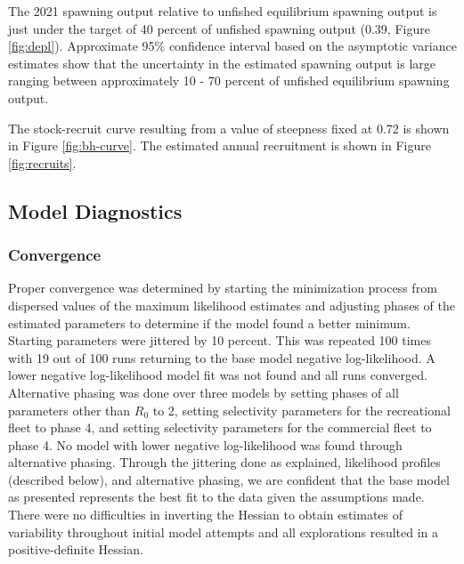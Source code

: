 \documentclass[11pt,
  english,
  a4paper,
]{article}
\begin{document}

The 2021 spawning output relative to unfished equilibrium spawning output is just under the target of 40 percent of unfished spawning output (0.39, Figure \ref{fig:depl}). Approximate 95\% confidence interval based on the asymptotic variance estimates show that the uncertainty in the estimated spawning output is large ranging between approximately 10 - 70 percent of unfished equilibrium spawning output.

\leavevmode\tagmcend\tagstructend\par


The stock-recruit curve resulting from a value of steepness fixed at 0.72 is shown in Figure \ref{fig:bh-curve}. The estimated annual recruitment is shown in Figure \ref{fig:recruits}.

\leavevmode\tagmcend\tagstructend\par


\hypertarget{model-diagnostics}{%
\subsection{Model Diagnostics}\label{model-diagnostics}}

\leavevmode\tagmcend\tagstructend


\hypertarget{convergence}{%
\subsubsection{Convergence}\label{convergence}}

\leavevmode\tagmcend\tagstructend


Proper convergence was determined by starting the minimization process from dispersed values of the maximum likelihood estimates and adjusting phases of the estimated parameters to determine if the model found a better minimum. Starting parameters were jittered by 10 percent. This was repeated 100 times with 19 out of 100 runs returning to the base model negative log-likelihood. A lower negative log-likelihood model fit was not found and all runs converged. Alternative phasing was done over three models by setting phases of all parameters other than {\(R_0\)\leavevmode\tagmcend\tagstructend} to 2, setting selectivity parameters for the recreational fleet to phase 4, and setting selectivity parameters for the commercial fleet to phase 4. No model with lower negative log-likelihood was found through alternative phasing. Through the jittering done as explained, likelihood profiles (described below), and alternative phasing, we are confident that the base model as presented represents the best fit to the data given the assumptions made. There were no difficulties in inverting the Hessian to obtain estimates of variability throughout initial model attempts and all explorations resulted in a positive-definite Hessian.
\end{document}
